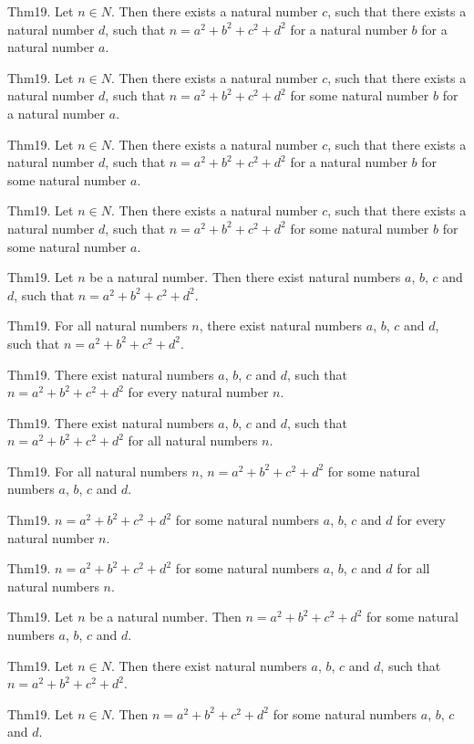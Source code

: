 \documentclass{article}
\begin{document}
Thm19. Let $n \in N$. Then there exists a natural number $c$, such that there exists a natural number $d$, such that $n = a ^{ 2}+ b ^{ 2}+ c ^{ 2}+ d ^{ 2}$ for a natural number $b$ for a natural number $a$.

Thm19. Let $n \in N$. Then there exists a natural number $c$, such that there exists a natural number $d$, such that $n = a ^{ 2}+ b ^{ 2}+ c ^{ 2}+ d ^{ 2}$ for some natural number $b$ for a natural number $a$.

Thm19. Let $n \in N$. Then there exists a natural number $c$, such that there exists a natural number $d$, such that $n = a ^{ 2}+ b ^{ 2}+ c ^{ 2}+ d ^{ 2}$ for a natural number $b$ for some natural number $a$.

Thm19. Let $n \in N$. Then there exists a natural number $c$, such that there exists a natural number $d$, such that $n = a ^{ 2}+ b ^{ 2}+ c ^{ 2}+ d ^{ 2}$ for some natural number $b$ for some natural number $a$.

Thm19. Let $n$ be a natural number. Then there exist natural numbers $a$, $b$, $c$ and $d$, such that $n = a ^{ 2}+ b ^{ 2}+ c ^{ 2}+ d ^{ 2}$.

Thm19. For all natural numbers $n$, there exist natural numbers $a$, $b$, $c$ and $d$, such that $n = a ^{ 2}+ b ^{ 2}+ c ^{ 2}+ d ^{ 2}$.

Thm19. There exist natural numbers $a$, $b$, $c$ and $d$, such that $n = a ^{ 2}+ b ^{ 2}+ c ^{ 2}+ d ^{ 2}$ for every natural number $n$.

Thm19. There exist natural numbers $a$, $b$, $c$ and $d$, such that $n = a ^{ 2}+ b ^{ 2}+ c ^{ 2}+ d ^{ 2}$ for all natural numbers $n$.

Thm19. For all natural numbers $n$, $n = a ^{ 2}+ b ^{ 2}+ c ^{ 2}+ d ^{ 2}$ for some natural numbers $a$, $b$, $c$ and $d$.

Thm19. $n = a ^{ 2}+ b ^{ 2}+ c ^{ 2}+ d ^{ 2}$ for some natural numbers $a$, $b$, $c$ and $d$ for every natural number $n$.

Thm19. $n = a ^{ 2}+ b ^{ 2}+ c ^{ 2}+ d ^{ 2}$ for some natural numbers $a$, $b$, $c$ and $d$ for all natural numbers $n$.

Thm19. Let $n$ be a natural number. Then $n = a ^{ 2}+ b ^{ 2}+ c ^{ 2}+ d ^{ 2}$ for some natural numbers $a$, $b$, $c$ and $d$.

Thm19. Let $n \in N$. Then there exist natural numbers $a$, $b$, $c$ and $d$, such that $n = a ^{ 2}+ b ^{ 2}+ c ^{ 2}+ d ^{ 2}$.

Thm19. Let $n \in N$. Then $n = a ^{ 2}+ b ^{ 2}+ c ^{ 2}+ d ^{ 2}$ for some natural numbers $a$, $b$, $c$ and $d$.
\end{document}
